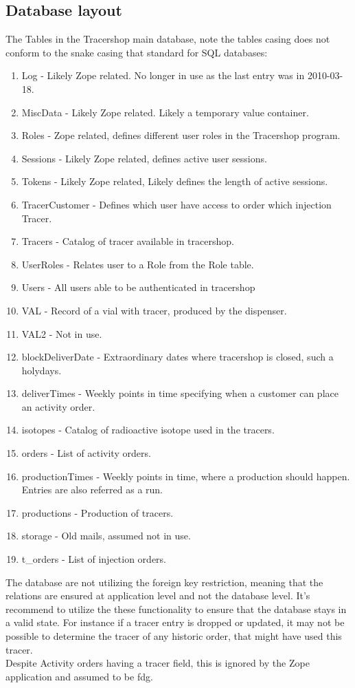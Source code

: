 \documentclass{article}
\begin{document}
\subsection*{Database layout}
The Tables in the Tracershop main database, note the tables casing does not conform to the snake casing that standard for SQL databases:
\begin{enumerate}
  \item Log - Likely Zope related. No longer in use as the last entry was in 2010-03-18.
  \item MiscData - Likely Zope related. Likely a temporary value container.
  \item Roles - Zope related, defines different user roles in the Tracershop program.
  \item Sessions - Likely Zope related, defines active user sessions.
  \item Tokens - Likely Zope related, Likely defines the length of active sessions.
  \item TracerCustomer - Defines which user have access to order which injection Tracer.
  \item Tracers - Catalog of tracer available in tracershop.
  \item UserRoles - Relates user to a Role from the Role table.
  \item Users - All users able to be authenticated in tracershop
  \item VAL - Record of a vial with tracer, produced by the dispenser.
  \item VAL2 - Not in use.
  \item blockDeliverDate - Extraordinary dates where tracershop is closed, such a holydays.
  \item deliverTimes - Weekly points in time specifying when a customer can place an activity order.
  \item isotopes - Catalog of radioactive isotope used in the tracers.
  \item orders - List of activity orders.
  \item productionTimes - Weekly points in time, where a production should happen. Entries are also referred as a run.
  \item productions - Production of tracers.
  \item storage - Old mails, assumed not in use.
  \item t\_orders - List of injection orders.
\end{enumerate}
The database are not utilizing the foreign key restriction, meaning that the relations are ensured at application level and not the database level.
It's recommend to utilize the these functionality to ensure that the database stays in a valid state.
For instance if a tracer entry is dropped or updated, it may not be possible to determine the tracer of any historic order, that might have used this tracer.\\
Despite Activity orders having a tracer field, this is ignored by the Zope application and assumed to be \Gls{fdg}.
\end{document}
